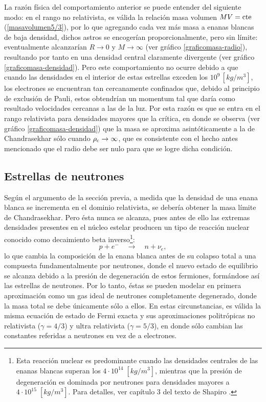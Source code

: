 La razón física del comportamiento anterior se puede entender del siguiente modo: en el rango no relativista, es válida la relación masa volumen $MV={\rm cte}$ (\eqref{masavolumen5/3}), por lo que agregando cada vez más masa a enanas blancas de baja densidad, dichos astros se encogerían proporcionalmente, pero sin límite: eventualmente alcanzarían $R\to 0$ y $M\to\infty$ (ver gráfico \ref{graficomasa-radio}), resultando por tanto en una densidad central claramente divergente (ver gráfico \ref{graficomasa-densidad}). Pero este comportamiento no ocurre debido a que cuando las densidades en el interior de estas estrellas exceden los $10^{9}\,[kg/m^3]$, los electrones se encuentran tan cercanamente confinados que, debido al principio de exclusión de Pauli, estos obtendrían un momentum tal que daría como resultado velocidades cercanas a las de la luz. Por esta razón es que se entra en el rango relativista para densidades mayores que la crítica, en donde se observa (ver gráfico \ref{graficomasa-densidad}) que la masa se aproxima asintóticamente a la de Chandrasekhar sólo cuando  $\rho_{\rm c}\to\infty$, que es consistente con el hecho antes mencionado que el radio debe ser nulo para que se logre dicha condición.


\subsection{Estrellas de neutrones}

Según el argumento de la sección previa, a medida que la densidad de una enana blanca se incrementa en el dominio relativista, se debería obtener la masa límite de Chandrasekhar. Pero ésta nunca se alcanza, pues antes de ello las extremas densidades presentes en el núcleo estelar producen un tipo de reacción nuclear conocido como decaimiento beta inverso\footnote{Esta reacción nuclear es predominante cuando las densidades centrales de las enanas blancas superan los $4\cdot10^{14}\;[kg/m^3]$, mientras que la presión de degeneración es dominada por neutrones para densidades mayores a $4\cdot10^{15}\;[kg/m^3]$. Para detalles, ver capítulo 3 del texto de Shapiro \cite{Shapiro83}. }:
\begin{equation}
 p+e^{-}\quad\longrightarrow\quad n+\nu_{e},
\end{equation}
lo que cambia la composición de la enana blanca antes de su colapso total a una compuesta fundamentalmente por neutrones, donde el nuevo estado de equilibrio se alcanza debido a la presión de degeneración de estos fermiones, formándose así las estrellas de neutrones. Por lo tanto, éstas se pueden modelar en primera aproximación como un gas ideal de neutrones completamente degenerado, donde la masa total se debe únicamente sólo a ellos. En estas circunstancias, es válida la misma ecuación de estado de Fermi exacta y sus aproximaciones politrópicas no relativista ($\gamma=4/3$) y ultra relativista ($\gamma=5/3$), en donde sólo cambian las constantes referidas a neutrones en vez de a electrones.

